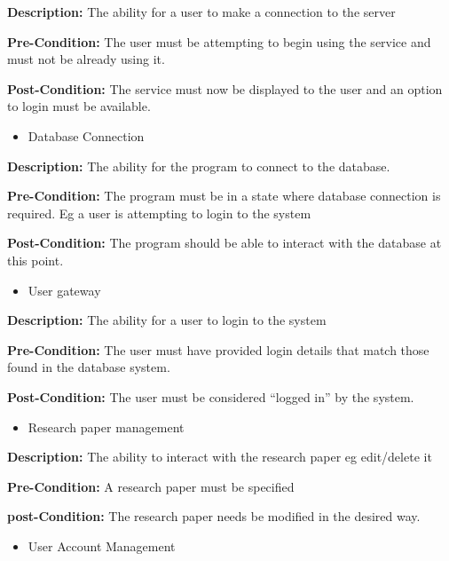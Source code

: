 \documentclass[11pt]{article}
\begin{document}
{\raggedright
	\textbf{Description: }The ability for a user to make a connection to the server
}

{\raggedright
	\textbf{Pre-Condition: }The user must be attempting to begin using the service
	and must not be already using it.
}

{\raggedright
	\textbf{Post-Condition:} The service must now be displayed to the user and an
	option to login must be available.
}

\begin{itemize}
	\item Database Connection
\end{itemize}

{\raggedright
	\textbf{Description: }The ability for the program to connect to the database.
}

{\raggedright
	\textbf{Pre-Condition: }The program must be in a state where database connection
	is required. Eg a user is attempting to login to the system
}

{\raggedright
	\textbf{Post-Condition: }The program should be able to interact with the
	database at this point.
}

\begin{itemize}
	\item User gateway
\end{itemize}

{\raggedright
	\textbf{Description: }The ability for a user to login to the system
}

{\raggedright
	\textbf{Pre-Condition: }The user must have provided login details that match
	those found in the database system.
}

{\raggedright
	\textbf{Post-Condition: }The user must be considered “logged in” by the system.
}

\begin{itemize}
	\item Research paper management
\end{itemize}

{\raggedright
	\textbf{Description: }The ability to interact with the research paper eg
	edit/delete it
}

{\raggedright
	\textbf{Pre-Condition: }A research paper must be specified
}

{\raggedright
	\textbf{post-Condition: }The research paper needs be modified in the desired
	way.
}

\begin{itemize}
	\item User Account Management
\end{itemize}
\end{document}
